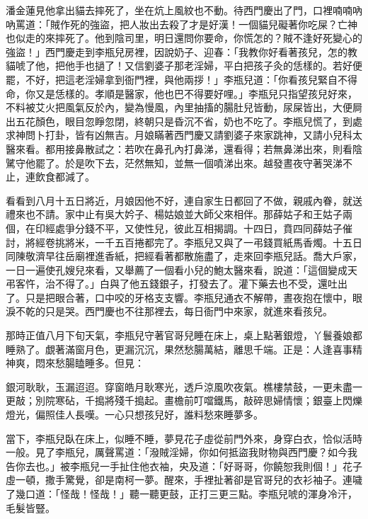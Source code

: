 潘金蓮見他拿出貓去摔死了，坐在炕上風紋也不動。待西門慶出了門，口裡喃喃吶吶罵道：「賊作死的強盜，把人妝出去殺了才是好漢！一個貓兒礙著你吃屎？亡神也似走的來摔死了。他到陰司里，明日還問你要命，你慌怎的？賊不逢好死變心的強盜！」西門慶走到李瓶兒房裡，因說奶子、迎春：「我教你好看著孩兒，怎的教貓唬了他，把他手也撾了！又信劉婆子那老淫婦，平白把孩子灸的恁樣的。若好便罷，不好，把這老淫婦拿到衙門裡，與他兩拶！」李瓶兒道：「你看孩兒緊自不得命，你又是恁樣的。孝順是醫家，他也巴不得要好哩。」李瓶兒只指望孩兒好來，不料被艾火把風氣反於內，變為慢風，內里抽搐的腸肚兒皆動，尿屎皆出，大便屙出五花顏色，眼目忽睜忽閉，終朝只是昏沉不省，奶也不吃了。李瓶兒慌了，到處求神問卜打卦，皆有凶無吉。月娘瞞著西門慶又請劉婆子來家跳神，又請小兒科太醫來看。都用接鼻散試之：若吹在鼻孔內打鼻涕，還看得；若無鼻涕出來，則看陰騭守他罷了。於是吹下去，茫然無知，並無一個噴涕出來。越發晝夜守著哭涕不止，連飲食都減了。

看看到八月十五日將近，月娘因他不好，連自家生日都回了不做，親戚內眷，就送禮來也不請。家中止有吳大妗子、楊姑娘並大師父來相伴。那薛姑子和王姑子兩個，在印經處爭分錢不平，又使性兒，彼此互相揭調。十四日，賁四同薛姑子催討，將經卷挑將米，一千五百捲都完了。李瓶兒又與了一弔錢買紙馬香燭。十五日同陳敬濟早往岳廟裡進香紙，把經看著都散施盡了，走來回李瓶兒話。喬大戶家，一日一遍使孔嫂兒來看，又舉薦了一個看小兒的鮑太醫來看，說道：「這個變成天弔客忤，治不得了。」白與了他五錢銀子，打發去了。灌下藥去也不受，還吐出了。只是把眼合著，口中咬的牙格支支響。李瓶兒通衣不解帶，晝夜抱在懷中，眼淚不乾的只是哭。西門慶也不往那裡去，每日衙門中來家，就進來看孩兒。

那時正值八月下旬天氣，李瓶兒守著官哥兒睡在床上，桌上點著銀燈，丫鬟養娘都睡熟了。覷著滿窗月色，更漏沉沉，果然愁腸萬結，離思千端。正是：人逢喜事精神爽，悶來愁腸瞌睡多。但見：

銀河耿耿，玉漏迢迢。穿窗皓月耿寒光，透戶涼風吹夜氣。樵樓禁鼓，一更未盡一更敲；別院寒砧，千搗將殘千搗起。畫檐前叮噹鐵馬，敲碎思婦情懷；銀臺上閃爍燈光，偏照佳人長嘆。一心只想孩兒好，誰料愁來睡夢多。

當下，李瓶兒臥在床上，似睡不睡，夢見花子虛從前門外來，身穿白衣，恰似活時一般。見了李瓶兒，厲聲罵道：「潑賊淫婦，你如何抵盜我財物與西門慶？如今我告你去也。」被李瓶兒一手扯住他衣袖，央及道：「好哥哥，你饒恕我則個！」花子虛一頓，撒手驚覺，卻是南柯一夢。醒來，手裡扯著卻是官哥兒的衣衫袖子。連噦了幾口道：「怪哉！怪哉！」聽一聽更鼓，正打三更三點。李瓶兒唬的渾身冷汗，毛髮皆豎。

